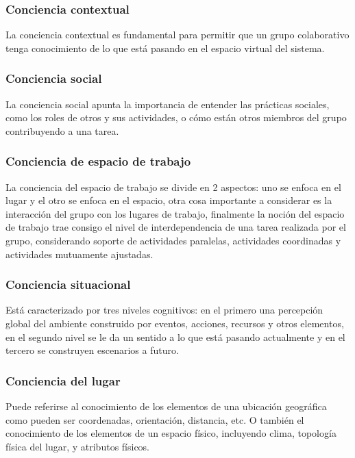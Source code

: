 \subsubsection{Conciencia contextual}

La conciencia contextual es fundamental para permitir que un grupo colaborativo tenga conocimiento de lo que est\'a pasando en el espacio virtual del sistema.

\subsubsection{Conciencia social}

La conciencia social \cite{antunes2014reviewing} apunta la importancia de entender las pr\'acticas sociales, como los roles de otros y sus actividades, o c\'omo est\'an otros miembros del grupo contribuyendo a una tarea.

\subsubsection{Conciencia de espacio de trabajo}

La conciencia del espacio de trabajo se divide en 2 aspectos: uno se enfoca en el lugar y el otro se enfoca en el espacio, otra cosa importante a considerar es la interacci\'on del grupo con los lugares de trabajo, finalmente la noci\'on del espacio de trabajo trae consigo el nivel de interdependencia de una tarea realizada por el grupo, considerando soporte de actividades paralelas, actividades coordinadas y actividades mutuamente ajustadas.

\subsubsection{Conciencia situacional}

Est\'a caracterizado por tres niveles cognitivos: en el primero una percepci\'on global del ambiente construido por eventos, acciones, recursos y otros elementos, en el segundo nivel se le da un sentido a lo que est\'a pasando actualmente y en el tercero se construyen escenarios a futuro.

\subsubsection{Conciencia del lugar}

Puede referirse al conocimiento de los elementos de una ubicaci\'on geogr\'afica como pueden ser coordenadas, orientaci\'on, distancia, etc. O tambi\'en el conocimiento de los elementos de un espacio f\'isico, incluyendo clima, topolog\'ia f\'isica del lugar, y atributos f\'isicos.

